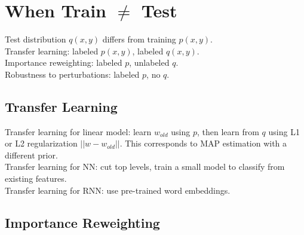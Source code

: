 \section{When Train $\neq$ Test}

Test distribution $q(x, y)$ differs from training $p(x, y)$.\\
Transfer learning: labeled $p(x, y)$, labeled $q(x, y)$.\\
Importance reweighting: labeled $p$, unlabeled $q$.\\
Robustness to perturbations: labeled $p$, no $q$.

\subsection*{Transfer Learning}

Transfer learning for linear model: learn $w_{old}$ using $p$, then learn from $q$ using L1 or L2 regularization $||w-w_{old}||$. This corresponds to MAP estimation with a different prior.\\
Transfer learning for NN: cut top levels, train a small model to classify from existing features.\\
Transfer learning for RNN: use pre-trained word embeddings.

\subsection*{Importance Reweighting}


